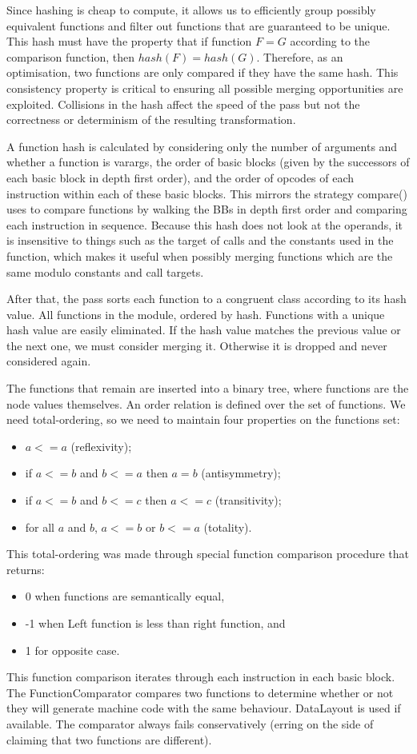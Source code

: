Since hashing is cheap to compute, it allows us to efficiently
group possibly equivalent functions and filter out functions
that are guaranteed to be unique.
This hash must have the property that if function $F = G$
according to the comparison function, then $hash(F) = hash(G)$.
Therefore, as an optimisation, two functions are only compared if they have the
same hash.
This consistency property is critical to ensuring all possible merging
opportunities are exploited.
Collisions in the hash affect the speed of the pass but not the correctness
or determinism of the resulting transformation.

A function hash is calculated by considering only the number of arguments and
whether a function is varargs, the order of basic blocks (given by the
successors of each basic block in depth first order), and the order of
opcodes of each instruction within each of these basic blocks. This mirrors
the strategy compare() uses to compare functions by walking the BBs in depth
first order and comparing each instruction in sequence. Because this hash
does not look at the operands, it is insensitive to things such as the
target of calls and the constants used in the function, which makes it useful
when possibly merging functions which are the same modulo constants and call
targets.

After that, the pass sorts each function to a congruent class according to
its hash value.
All functions in the module, ordered by hash. Functions with a unique
hash value are easily eliminated.
If the hash value matches the previous value or the next one, we must
consider merging it. Otherwise it is dropped and never considered again.

The functions that remain are inserted into a binary tree, where functions are
the node values themselves.
An order relation is defined over the set of functions.
We need total-ordering, so we need to maintain four properties on the functions set:
\begin{itemize}
\item $a <= a$ (reflexivity);
\item if $a <= b$ and $b <= a$ then $a = b$ (antisymmetry);
\item if $a <= b$ and $b <= c$ then $a <= c$ (transitivity);
\item for all $a$ and $b$, $a <= b$ or $b <= a$ (totality).
\end{itemize}
This total-ordering was made through special function comparison procedure that
returns:
\begin{itemize}
\item 0 when functions are semantically equal,
\item -1 when Left function is less than right function, and
\item 1 for opposite case.
\end{itemize}
This function comparison iterates through each instruction in each basic block.
The FunctionComparator compares two functions to determine whether or not
they will generate machine code with the same behaviour. DataLayout is
used if available. The comparator always fails conservatively (erring on the
side of claiming that two functions are different).


